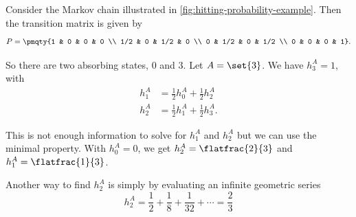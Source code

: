 \begin{example}
    Consider the Markov chain illustrated in \autoref{fig:hitting-probability-example}. Then the transition matrix is given by
    \[
        P = \pmqty{1 & 0 & 0 & 0 \\ 1/2 & 0 & 1/2 & 0 \\ 0 & 1/2 & 0 & 1/2 \\ 0 & 0 & 0 & 1}.
    \]

    So there are two absorbing states, \(0\) and \(3\). Let \(A = \set{3}\). We have \(h_3^A = 1\), with
    \begin{align*}
        h_1^A &= \frac{1}{2} h_0^A + \frac{1}{2} h_2^A \\
        h_2^A &= \frac{1}{2} h_1^A + \frac{1}{2} h_3^A.
    \end{align*}

    This is not enough information to solve for \(h_1^A\) and \(h_2^A\) but we can use the minimal property. With \(h_0^A = 0\), we get \(h_2^A = \flatfrac{2}{3}\) and \(h_1^A = \flatfrac{1}{3}\).

    Another way to find \(h_2^A\) is simply by evaluating an infinite geometric series
    \[
        h_2^A = \frac{1}{2} + \frac{1}{8} + \frac{1}{32} + \cdots = \frac{2}{3}
    \]
\end{example}

